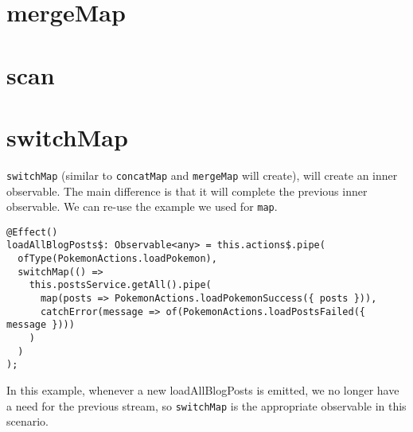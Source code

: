 \section{mergeMap}

\section{scan}

\section{switchMap}
\lstinline{switchMap} (similar to \lstinline{concatMap} and \lstinline{mergeMap}
will create), will create an inner observable. The main difference is that it
will complete the previous inner observable. We can re-use the example we used
for \lstinline{map}. 

\begin{lstlisting}[caption=switchMap example]
@Effect()
loadAllBlogPosts$: Observable<any> = this.actions$.pipe(
  ofType(PokemonActions.loadPokemon),
  switchMap(() =>
    this.postsService.getAll().pipe(
      map(posts => PokemonActions.loadPokemonSuccess({ posts })),
      catchError(message => of(PokemonActions.loadPostsFailed({ message })))
    )
  )
);  
\end{lstlisting}

In this example, whenever a new loadAllBlogPosts is emitted, we no longer 
have a need for the previous stream, so \lstinline{switchMap} is the 
appropriate observable in this scenario. 
